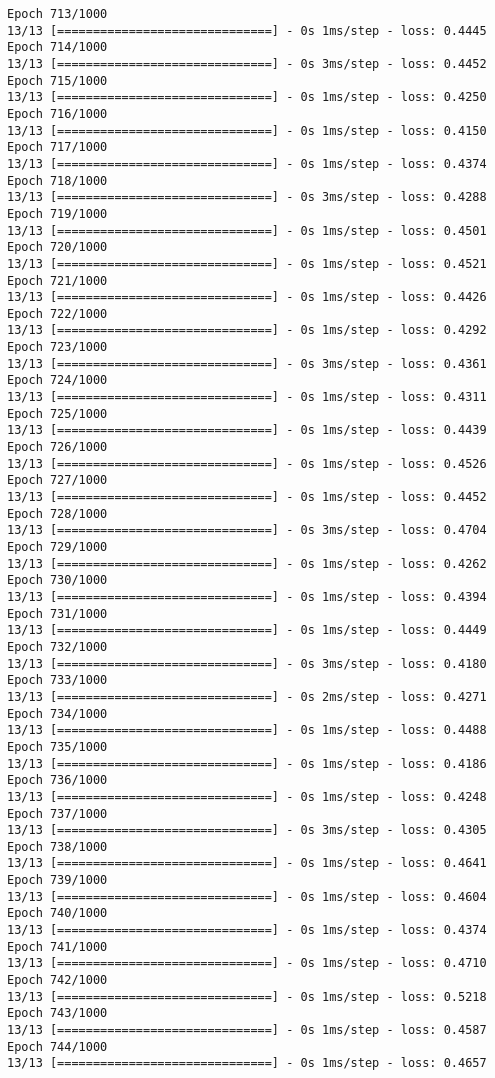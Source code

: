 \documentclass[11pt]{article}
\begin{document}
\begin{Verbatim}[commandchars=\\\{\}]
Epoch 713/1000
13/13 [==============================] - 0s 1ms/step - loss: 0.4445
Epoch 714/1000
13/13 [==============================] - 0s 3ms/step - loss: 0.4452
Epoch 715/1000
13/13 [==============================] - 0s 1ms/step - loss: 0.4250
Epoch 716/1000
13/13 [==============================] - 0s 1ms/step - loss: 0.4150
Epoch 717/1000
13/13 [==============================] - 0s 1ms/step - loss: 0.4374
Epoch 718/1000
13/13 [==============================] - 0s 3ms/step - loss: 0.4288
Epoch 719/1000
13/13 [==============================] - 0s 1ms/step - loss: 0.4501
Epoch 720/1000
13/13 [==============================] - 0s 1ms/step - loss: 0.4521
Epoch 721/1000
13/13 [==============================] - 0s 1ms/step - loss: 0.4426
Epoch 722/1000
13/13 [==============================] - 0s 1ms/step - loss: 0.4292
Epoch 723/1000
13/13 [==============================] - 0s 3ms/step - loss: 0.4361
Epoch 724/1000
13/13 [==============================] - 0s 1ms/step - loss: 0.4311
Epoch 725/1000
13/13 [==============================] - 0s 1ms/step - loss: 0.4439
Epoch 726/1000
13/13 [==============================] - 0s 1ms/step - loss: 0.4526
Epoch 727/1000
13/13 [==============================] - 0s 1ms/step - loss: 0.4452
Epoch 728/1000
13/13 [==============================] - 0s 3ms/step - loss: 0.4704
Epoch 729/1000
13/13 [==============================] - 0s 1ms/step - loss: 0.4262
Epoch 730/1000
13/13 [==============================] - 0s 1ms/step - loss: 0.4394
Epoch 731/1000
13/13 [==============================] - 0s 1ms/step - loss: 0.4449
Epoch 732/1000
13/13 [==============================] - 0s 3ms/step - loss: 0.4180
Epoch 733/1000
13/13 [==============================] - 0s 2ms/step - loss: 0.4271
Epoch 734/1000
13/13 [==============================] - 0s 1ms/step - loss: 0.4488
Epoch 735/1000
13/13 [==============================] - 0s 1ms/step - loss: 0.4186
Epoch 736/1000
13/13 [==============================] - 0s 1ms/step - loss: 0.4248
Epoch 737/1000
13/13 [==============================] - 0s 3ms/step - loss: 0.4305
Epoch 738/1000
13/13 [==============================] - 0s 1ms/step - loss: 0.4641
Epoch 739/1000
13/13 [==============================] - 0s 1ms/step - loss: 0.4604
Epoch 740/1000
13/13 [==============================] - 0s 1ms/step - loss: 0.4374
Epoch 741/1000
13/13 [==============================] - 0s 1ms/step - loss: 0.4710
Epoch 742/1000
13/13 [==============================] - 0s 1ms/step - loss: 0.5218
Epoch 743/1000
13/13 [==============================] - 0s 1ms/step - loss: 0.4587
Epoch 744/1000
13/13 [==============================] - 0s 1ms/step - loss: 0.4657

\end{Verbatim}
\end{document}

